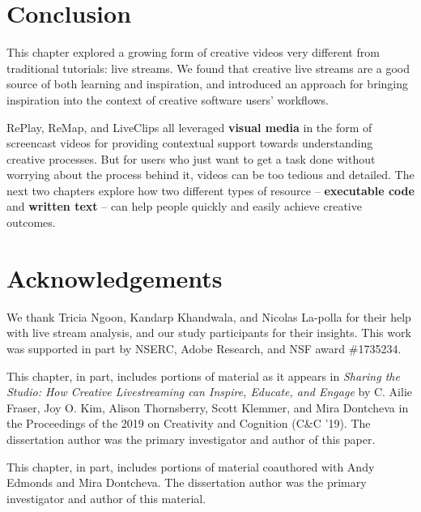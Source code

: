 \section{Conclusion}
This chapter explored a growing form of creative videos very different from traditional tutorials: live streams. We found that creative live streams are a good source of both learning and inspiration, and introduced an approach for bringing inspiration into the context of creative software users' workflows. 

RePlay, ReMap, and LiveClips all leveraged \textbf{visual media} in the form of screencast videos for providing contextual support towards understanding creative processes. But for users who just want to get a task done without worrying about the process behind it, videos can be too tedious and detailed. The next two chapters explore how two different types of resource -- \textbf{executable code} and \textbf{written text} -- can help people quickly and easily achieve creative outcomes.


\section{Acknowledgements}
We thank Tricia Ngoon, Kandarp Khandwala, and Nicolas La-polla for their help with live stream analysis, and our study participants for their insights. This work was supported in part by NSERC, Adobe Research, and NSF award \#1735234.

This chapter, in part, includes portions of material as it appears in \textit{Sharing the Studio: How Creative Livestreaming can Inspire, Educate, and Engage} by C. Ailie Fraser, Joy O. Kim, Alison Thornsberry, Scott Klemmer, and Mira Dontcheva in the Proceedings of the 2019 on Creativity and Cognition (C\&C '19). The dissertation author was the primary investigator and author of this paper.

This chapter, in part, includes portions of material coauthored with Andy Edmonds and Mira Dontcheva. The dissertation author was the primary investigator and author of this material.